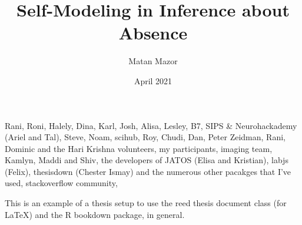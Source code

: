 \documentclass[12pt,twoside]{reedthesis}
\title{Self-Modeling in Inference about Absence}
\author{Matan Mazor}
\date{April 2021}
\begin{document}
  \maketitle

\frontmatter %
\pagestyle{empty} %
  \begin{acknowledgements}
    Rani, Roni, Halely, Dina, Karl, Josh, Alisa, Lesley, B7, SIPS \& Neurohackademy (Ariel and Tal), Steve, Noam, scihub, Roy, Chudi, Dan, Peter Zeidman, Rani, Dominic and the Hari Krishna volunteers, my participants, imaging team, Kamlyn, Maddi and Shiv, the developers of JATOS (Elisa and Kristian), labjs (Felix), thesisdown (Chester Ismay) and the numerous other pacakges that I've used, stackoverflow community,
  \end{acknowledgements}
  \begin{preface}
    This is an example of a thesis setup to use the reed thesis document class
    (for LaTeX) and the R bookdown package, in general.
  \end{preface}
  \hypersetup{linkcolor=black}
  \setcounter{secnumdepth}{2}
  \setcounter{tocdepth}{2}
  \tableofcontents

  \listoftables
\end{document}
